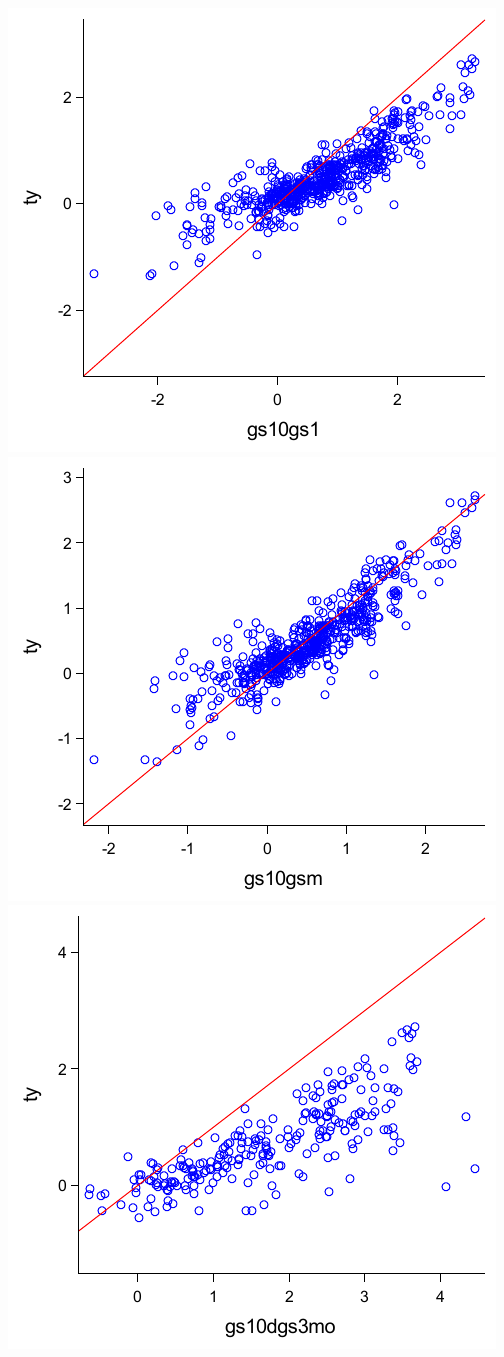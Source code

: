 \documentclass{article}
\begin{document}
\noindent
\includegraphics{scatter/gs10gs1}\includegraphics{scatter/gs10gsm}\\
\includegraphics{scatter/gs10dgs3mo}
\end{document}
